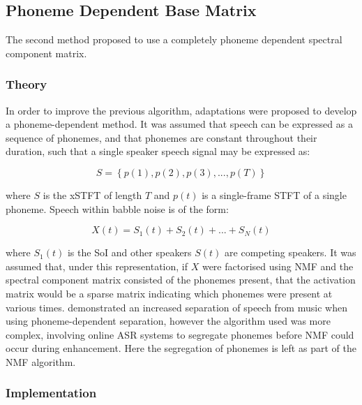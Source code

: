 \subsection{\label{sub:Phoneme-Base}Phoneme Dependent Base Matrix}

The second method proposed to use a completely phoneme dependent spectral
component matrix.


\subsubsection*{Theory}

In order to improve the previous algorithm, adaptations were proposed
to develop a phoneme-dependent method. It was assumed that speech
can be expressed as a sequence of phonemes, and that phonemes are
constant throughout their duration, such that a single speaker speech
signal may be expressed as:

\[
S=\left\{ p\left(1\right),p\left(2\right),p\left(3\right),...,p\left(T\right)\right\} 
\]



where $S$ is the x\ac{STFT} of length $T$ and $p\left(t\right)$
is a single-frame \ac{STFT} of a single phoneme. Speech within babble
noise is of the form:

\[
X\left(t\right)=S_{1}\left(t\right)+S_{2}\left(t\right)+...+S_{N}\left(t\right)
\]


where $S_{1}\left(t\right)$ is the \ac{SoI} and other speakers $S\left(t\right)$
are competing speakers. It was assumed that, under this representation,
if $X$ were factorised using \ac{NMF} and the spectral component
matrix consisted of the phonemes present, that the activation matrix
would be a sparse matrix indicating which phonemes were present at
various times. \citet{Raj2011} demonstrated an increased separation
of speech from music when using phoneme-dependent separation, however
the algorithm used was more complex, involving online \ac{ASR} systems
to segregate phonemes before \ac{NMF} could occur during enhancement.
Here the segregation of phonemes is left as part of the \ac{NMF}
algorithm.


\subsubsection*{Implementation}

